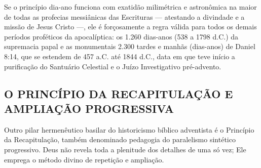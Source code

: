 Se o princípio dia-ano funciona com exatidão milimétrica e astronômica na maior de todas as profecias messiânicas das Escrituras — atestando a divindade e a missão de Jesus Cristo —, ele é forçosamente a regra válida para todos os demais períodos proféticos da apocalíptica: os 1.260 dias-anos (538 a 1798 d.C.) da supremacia papal e as monumentais 2.300 tardes e manhãs (dias-anos) de Daniel 8:14, que se estendem de 457 a.C. até 1844 d.C., data em que teve início a purificação do Santuário Celestial e o Juízo Investigativo pré-advento.



\subsection{O PRINCÍPIO DA RECAPITULAÇÃO E AMPLIAÇÃO PROGRESSIVA}


Outro pilar hermenêutico basilar do historicismo bíblico adventista é o Princípio da Recapitulação, também denominado pedagogia do paralelismo sintético progressivo. Deus não revela toda a plenitude dos detalhes de uma só vez; Ele emprega o método divino de repetição e ampliação.

